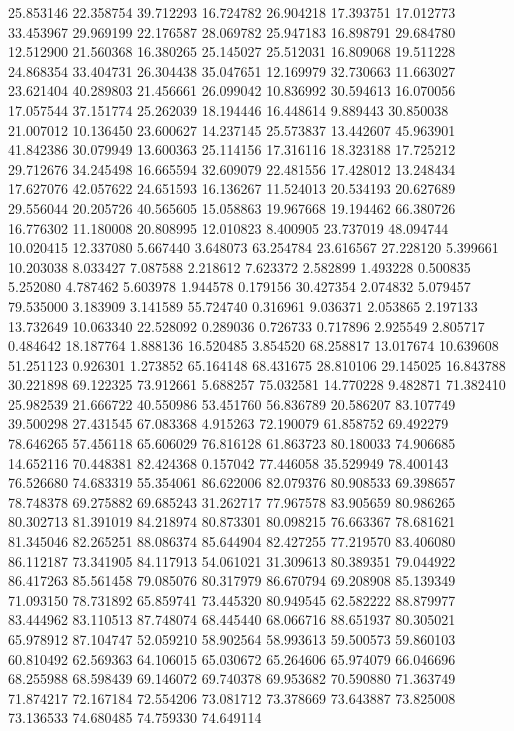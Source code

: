 25.853146
22.358754
39.712293
16.724782
26.904218
17.393751
17.012773
33.453967
29.969199
22.176587
28.069782
25.947183
16.898791
29.684780
12.512900
21.560368
16.380265
25.145027
25.512031
16.809068
19.511228
24.868354
33.404731
26.304438
35.047651
12.169979
32.730663
11.663027
23.621404
40.289803
21.456661
26.099042
10.836992
30.594613
16.070056
17.057544
37.151774
25.262039
18.194446
16.448614
9.889443
30.850038
21.007012
10.136450
23.600627
14.237145
25.573837
13.442607
45.963901
41.842386
30.079949
13.600363
25.114156
17.316116
18.323188
17.725212
29.712676
34.245498
16.665594
32.609079
22.481556
17.428012
13.248434
17.627076
42.057622
24.651593
16.136267
11.524013
20.534193
20.627689
29.556044
20.205726
40.565605
15.058863
19.967668
19.194462
66.380726
16.776302
11.180008
20.808995
12.010823
8.400905
23.737019
48.094744
10.020415
12.337080
5.667440
3.648073
63.254784
23.616567
27.228120
5.399661
10.203038
8.033427
7.087588
2.218612
7.623372
2.582899
1.493228
0.500835
5.252080
4.787462
5.603978
1.944578
0.179156
30.427354
2.074832
5.079457
79.535000
3.183909
3.141589
55.724740
0.316961
9.036371
2.053865
2.197133
13.732649
10.063340
22.528092
0.289036
0.726733
0.717896
2.925549
2.805717
0.484642
18.187764
1.888136
16.520485
3.854520
68.258817
13.017674
10.639608
51.251123
0.926301
1.273852
65.164148
68.431675
28.810106
29.145025
16.843788
30.221898
69.122325
73.912661
5.688257
75.032581
14.770228
9.482871
71.382410
25.982539
21.666722
40.550986
53.451760
56.836789
20.586207
83.107749
39.500298
27.431545
67.083368
4.915263
72.190079
61.858752
69.492279
78.646265
57.456118
65.606029
76.816128
61.863723
80.180033
74.906685
14.652116
70.448381
82.424368
0.157042
77.446058
35.529949
78.400143
76.526680
74.683319
55.354061
86.622006
82.079376
80.908533
69.398657
78.748378
69.275882
69.685243
31.262717
77.967578
83.905659
80.986265
80.302713
81.391019
84.218974
80.873301
80.098215
76.663367
78.681621
81.345046
82.265251
88.086374
85.644904
82.427255
77.219570
83.406080
86.112187
73.341905
84.117913
54.061021
31.309613
80.389351
79.044922
86.417263
85.561458
79.085076
80.317979
86.670794
69.208908
85.139349
71.093150
78.731892
65.859741
73.445320
80.949545
62.582222
88.879977
83.444962
83.110513
87.748074
68.445440
68.066716
88.651937
80.305021
65.978912
87.104747
52.059210
58.902564
58.993613
59.500573
59.860103
60.810492
62.569363
64.106015
65.030672
65.264606
65.974079
66.046696
68.255988
68.598439
69.146072
69.740378
69.953682
70.590880
71.363749
71.874217
72.167184
72.554206
73.081712
73.378669
73.643887
73.825008
73.136533
74.680485
74.759330
74.649114
